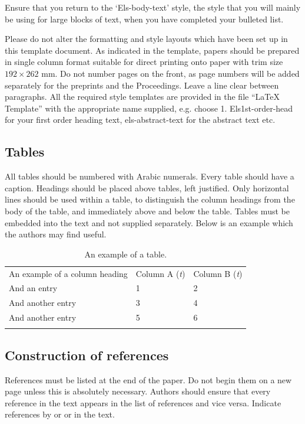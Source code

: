 \documentclass[3p,times,procedia]{elsarticle}
\begin{document}
Ensure that you return to the `Els-body-text' style, the style that you will mainly be using for large blocks of text, when you have completed your bulleted list. 

Please do not alter the formatting and style layouts which have been set up in this template document. As indicated in the template, papers should be prepared in single column format suitable for direct printing onto paper with trim size $192 \times 262$ mm. Do not number pages on the front, as page numbers will be added separately for the preprints and the Proceedings. Leave a line clear between paragraphs. All the required style templates are provided in the file ``LaTeX Template'' with the appropriate name supplied, e.g. choose 1. Els1st-order-head for your first order heading text, els-abstract-text for the abstract text etc.

\subsection{ Tables}

All tables should be numbered with Arabic numerals. Every table should have a caption. Headings should be placed above tables, left justified. Only horizontal lines should be used within a table, to distinguish the column headings from the body of the table, and immediately above and below the table. Tables must be embedded into the text and not supplied separately. Below is an example which the authors may find useful.

\begin{table}[h]
\caption{An example of a table.}
\begin{tabular*}{\hsize}{@{\extracolsep{\fill}}lll@{}}
\toprule
An example of a column heading & Column A ({\it{t}}) & Column B ({\it{t}})\\
\colrule
And an entry &   1 &  2\\
And another entry  & 3 &  4\\
And another entry &  5 &  6\\
\botrule
\end{tabular*}
\end{table}


\subsection{ Construction of references}

References must be listed at the end of the paper. Do not begin them on a new page unless this is absolutely necessary. Authors should ensure that every reference in the text appears in the list of references and vice versa. Indicate references by \cite{Massimo2011} or \cite{Massimo2012} or \cite{Thomas2015} in the text. 
\end{document}

